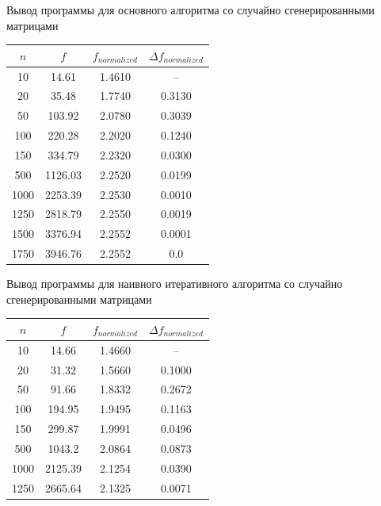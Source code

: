 \documentclass[12pt]{beamer}
\begin{document}
\begin{frame}{Вывод программы для основного алгоритма со случайно сгенерированными матрицами}

\begin{tabular}{|c|c|c|c|}
\hline $n$ & $f$ & $f_{normalized}$  & $\Delta f_{normalized}$\\
\hline 10 & 14.61 & 1.4610 & -- \\
\hline 20 & 35.48 & 1.7740 & 0.3130 \\
\hline 50 & 103.92 & 2.0780 & 0.3039 \\
\hline 100 & 220.28 & 2.2020 & 0.1240 \\
\hline 150 & 334.79 & 2.2320 & 0.0300 \\
\hline 500 & 1126.03 & 2.2520 & 0.0199 \\
\hline 1000 & 2253.39 & 2.2530 & 0.0010 \\
\hline 1250 & 2818.79 & 2.2550 & 0.0019 \\
\hline 1500 & 3376.94 &  2.2552 & 0.0001 \\
\hline 1750 & 3946.76 & 2.2552 & 0.0 \\
\hline
\end{tabular}
\end{frame}

\begin{frame}{Вывод программы для наивного итеративного алгоритма со случайно сгенерированными матрицами}

\begin{tabular}{|c|c|c|c|}
\hline $n$ & $f$ & $f_{normalized}$ & $\Delta f_{normalized}$ \\
\hline 10 & 14.66 & 1.4660 & -- \\
\hline 20 & 31.32 & 1.5660 & 0.1000 \\
\hline 50 & 91.66 & 1.8332 & 0.2672 \\
\hline 100 & 194.95 & 1.9495 & 0.1163 \\
\hline 150 & 299.87 & 1.9991 & 0.0496 \\
\hline 500 & 1043.2 & 2.0864 & 0.0873 \\
\hline 1000 & 2125.39 & 2.1254 & 0.0390 \\
\hline 1250 & 2665.64 & 2.1325 & 0.0071 \\
\hline
\end{tabular}
\end{frame}
\end{document}
